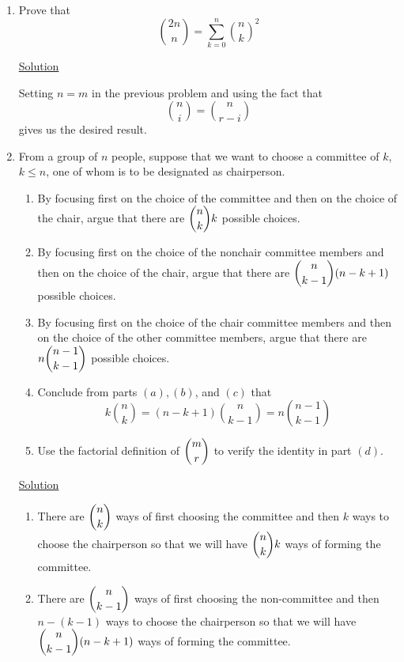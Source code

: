 \begin{enumerate}
\item Prove that
\[\binom{2n}{n} = \sum_{k=0}^n\binom{n}{k}^2\]

\underline{Solution}

Setting $n = m$ in the previous problem and using the fact that 
\[\binom{n}{i} = \binom{n}{r - i}\]
gives us the desired result.

\item From a group of $n$ people, suppose that we want to choose a committee of
$k$, $k \le n$, one of whom is to be designated as chairperson.

\begin{enumerate}
\item By focusing first on the choice of the committee and then on the choice of
the chair, argue that there are $\dbinom{n}{k}k$ possible choices.

\item By focusing first on the choice of the nonchair committee members and then
on the choice of the chair, argue that there are $\dbinom{n}{k - 1}(n - k + 1)$
possible choices.

\item By focusing first on the choice of the chair committee members and then
on the choice of the other committee members, argue that there are
$n\dbinom{n - 1}{k - 1}$ possible choices.

\item Conclude from parts $(a), (b)$, and $(c)$ that
\[k\binom{n}{k} = (n - k + 1)\binom{n}{k - 1} = n\binom{n - 1}{k - 1}\]

\item Use the factorial definition of $\dbinom{m}{r}$ to verify the identity in
part $(d)$.
\end{enumerate}

\underline{Solution}

\begin{enumerate}
\item There are $\dbinom{n}{k}$ ways of first choosing the committee and then
$k$ ways to choose the chairperson so that we will have $\dbinom{n}{k}k$ ways of
forming the committee.

\item There are $\dbinom{n}{k - 1}$ ways of first choosing the non-committee and
then $n - (k - 1)$ ways to choose the chairperson so that we will have
$\dbinom{n}{k - 1}(n - k + 1)$ ways of forming the committee.


\end{enumerate}
\end{enumerate}
